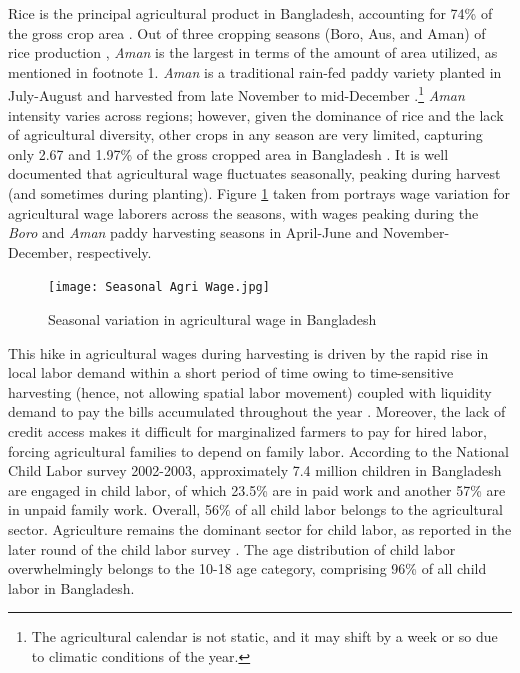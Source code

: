 \documentclass[12pt,letterpaper]{article}
\newcommand{\0}{\ensuremath{\mbox{\boldmath $0$}}}
\begin{document}
Rice is the principal agricultural product in Bangladesh, accounting for 74\% of the gross crop area \citep{tisdell2019agricultural}. Out of three cropping seasons (Boro, Aus, and Aman) of rice production \citep{laborte2017riceatlas}, \textit{Aman} is the largest in terms of the amount of area utilized, as mentioned in footnote 1. \textit{Aman} is a traditional rain-fed paddy variety planted in July-August and harvested from late November to mid-December \citep{shelley2016rice}.\footnote{The agricultural calendar is not static, and it may shift by a week or so due to climatic conditions of the year. } \textit{Aman} intensity varies across regions; however, given the dominance of rice and the lack of agricultural diversity, other crops in any season are very limited, capturing only 2.67 and 1.97\% of the gross cropped area in Bangladesh \citep{tisdell2019agricultural}. It is well documented that agricultural wage fluctuates seasonally, peaking during harvest (and sometimes during planting). Figure \ref{wage} taken from \citet{rahman1988labour} portrays wage variation for agricultural wage laborers across the seasons, with wages peaking during the \textit{Boro} and \textit{Aman} paddy harvesting seasons in April-June and November-December, respectively.

\begin{figure}[h!]
\centering
\texttt{[image: Seasonal Agri Wage.jpg]}\\
\caption{Seasonal variation in agricultural wage in Bangladesh}
\label{wage}
\end{figure}

This hike in agricultural wages during harvesting is driven by the rapid rise in local labor demand within a short period of time owing to time-sensitive harvesting (hence, not allowing spatial labor movement) coupled with liquidity demand to pay the bills accumulated throughout the year \citep{burke2019sell}. Moreover, the lack of credit access makes it difficult for marginalized farmers to pay for hired labor, forcing agricultural families to depend on family labor. According to the \cite{bbs2003report} National Child Labor survey 2002-2003, approximately 7.4 million children in Bangladesh are engaged in child labor, of which 23.5\% are in paid work and another 57\% are in unpaid family work. Overall, 56\% of all child labor belongs to the agricultural sector. Agriculture remains the dominant sector for child labor, as reported in the later round of the child labor survey \citep{bbs2013report}. The age distribution of child labor overwhelmingly belongs to the 10-18 age category, comprising 96\% of all child labor in Bangladesh.
\end{document}
